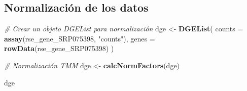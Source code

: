 \documentclass[
]{article}
\newenvironment{Shaded}{\begin{snugshade}}{\end{snugshade}}
\newcommand{\AttributeTok}[1]{\textcolor[rgb]{0.13,0.29,0.53}{#1}}
\newcommand{\CommentTok}[1]{\textcolor[rgb]{0.56,0.35,0.01}{\textit{#1}}}
\newcommand{\FunctionTok}[1]{\textcolor[rgb]{0.13,0.29,0.53}{\textbf{#1}}}
\newcommand{\NormalTok}[1]{#1}
\newcommand{\OtherTok}[1]{\textcolor[rgb]{0.56,0.35,0.01}{#1}}
\newcommand{\StringTok}[1]{\textcolor[rgb]{0.31,0.60,0.02}{#1}}
\begin{document}
\subsection{Normalización de los
datos}\label{normalizaciuxf3n-de-los-datos}

\begin{Shaded}
\begin{Highlighting}[]
\CommentTok{\# Crear un objeto DGEList para normalización}
\NormalTok{dge }\OtherTok{\textless{}{-}} \FunctionTok{DGEList}\NormalTok{(}
    \AttributeTok{counts =} \FunctionTok{assay}\NormalTok{(rse\_gene\_SRP075398, }\StringTok{"counts"}\NormalTok{),}
    \AttributeTok{genes =} \FunctionTok{rowData}\NormalTok{(rse\_gene\_SRP075398)}
\NormalTok{)}

\CommentTok{\# Normalización TMM}
\NormalTok{dge }\OtherTok{\textless{}{-}} \FunctionTok{calcNormFactors}\NormalTok{(dge)}

\NormalTok{dge}
\end{Highlighting}
\end{Shaded}
\end{document}
